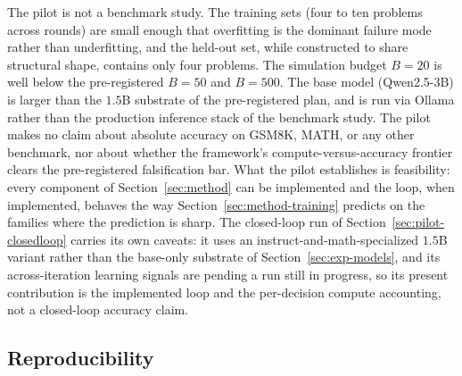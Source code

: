 The pilot is not a benchmark study. The training sets (four to ten
problems across rounds) are small enough that overfitting is the
dominant failure mode rather than underfitting, and the held-out set,
while constructed to share structural shape, contains only four
problems. The simulation
budget $B = 20$ is well below the pre-registered $B = 50$ and $B = 500$.
The base model (Qwen2.5-3B) is larger than the $1.5$B substrate of the
pre-registered plan, and is run via Ollama rather than the production
inference stack of the benchmark study. The pilot makes no
claim about absolute accuracy on GSM8K, MATH, or any other benchmark,
nor about whether the framework's compute-versus-accuracy frontier
clears the pre-registered falsification bar. What the pilot establishes
is feasibility: every component of Section~\ref{sec:method} can be
implemented and the loop, when implemented, behaves the way
Section~\ref{sec:method-training} predicts on the families where the
prediction is sharp. The closed-loop run of
Section~\ref{sec:pilot-closedloop} carries its own caveats: it uses an
instruct-and-math-specialized $1.5$B variant rather than the base-only
substrate of Section~\ref{sec:exp-models}, and its across-iteration learning
signals are pending a run still in progress, so its present contribution is the
implemented loop and the per-decision compute accounting, not a closed-loop
accuracy claim.

\subsection{Reproducibility}
\label{sec:pilot-reproducibility}

